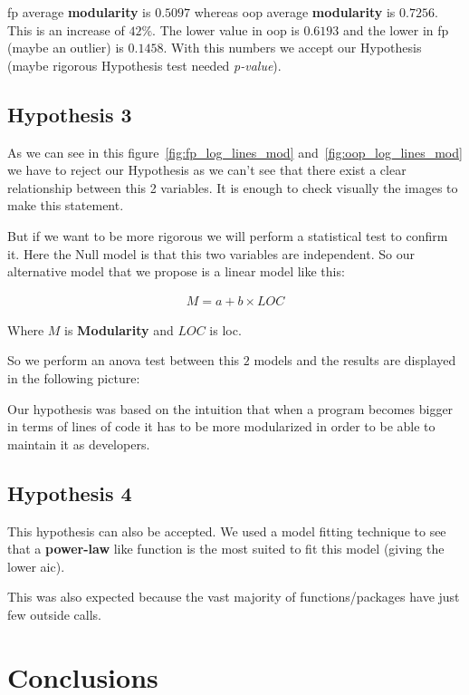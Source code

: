 \documentclass[12pt, a4paper]{article}
\begin{document}
\acrlong{fp} average \textbf{modularity} is $0.5097$ whereas \acrlong{oop} average \textbf{modularity} is $0.7256$. This is an increase of $42\%$.
The lower value in \acrlong{oop} is $0.6193$ and the lower in \acrlong{fp} (maybe an outlier) is $0.1458$. With this numbers we accept our Hypothesis (maybe rigorous Hypothesis test needed \textit{p-value}). 

\subsection{Hypothesis 3}
As we can see in this figure~\ref{fig:fp_log_lines_mod} and~\ref{fig:oop_log_lines_mod} we have to reject our Hypothesis as we can't see that there exist a clear relationship between this 2 variables. It is enough to check visually the images to make this statement.

But if we want to be more rigorous we will perform a statistical test to confirm it. Here the Null model is that this two variables are independent. So our alternative model that we propose is a linear model like this:

\begin{subequations}
    \begin{align}
        M = a + b \times LOC
    \end{align}
\end{subequations}

Where $M$ is \textbf{Modularity} and $LOC$ is \acrlong{loc}.

So we perform an \acrfull{anova} test between this $2$ models and the results are displayed in the following picture:

Our hypothesis was based on the intuition that when a program becomes bigger in terms of lines of code it has to be more modularized in order to be able to maintain it as developers.

\subsection{Hypothesis 4}

This hypothesis can also be accepted. We used a model fitting technique to see that a \textbf{power-law} like function is the most suited to fit this model (giving the lower \acrfull{aic}).

This was also expected because the vast majority of functions/packages have just few outside calls.

\section{Conclusions}
\end{document}
